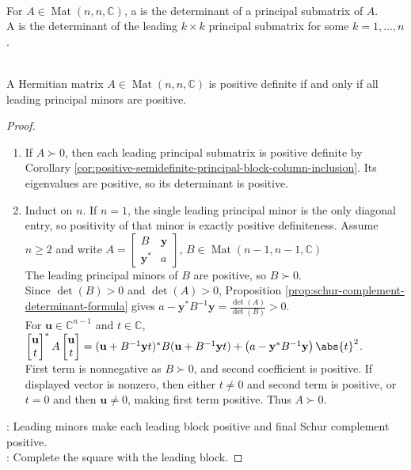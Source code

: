 \begin{definition} \label{def:principal-and-leading-principal-minors} \\
For $A\in\operatorname{Mat}(n,n,\mathbb{C})$, a  is the determinant of a principal submatrix of $A$.\\
A  is the determinant of the leading $k\times k$ principal submatrix for some $k=1,\ldots,n$.
\end{definition}

\begin{theorem} \label{thm:sylvester-positive-definite-criterion-leading-minors} \\
A Hermitian matrix $A\in\operatorname{Mat}(n,n,\mathbb{C})$ is positive definite if and only if all leading principal minors are positive.
\begin{proof}
\begin{enumerate}[label=\roman*.]
\setlength{\itemsep}{0pt}
\item[$(\Rightarrow)$] If $A\succ0$, then each leading principal submatrix is positive definite by Corollary \ref{cor:positive-semidefinite-principal-block-column-inclusion}. Its eigenvalues are positive, so its determinant is positive.
\item[$(\Leftarrow)$] Induct on $n$. If $n=1$, the single leading principal minor is the only diagonal entry, so positivity of that minor is exactly positive definiteness. Assume $n\geq2$ and write $A=
\begin{bmatrix}
B & \mathbf{y}\\
\mathbf{y}^* & a
\end{bmatrix}$, $B\in\operatorname{Mat}(n-1,n-1,\mathbb{C})$\\
The leading principal minors of $B$ are positive, so $B\succ0$.\\
Since $\det(B)>0$ and $\det(A)>0$, Proposition \ref{prop:schur-complement-determinant-formula} gives $a-\mathbf{y}^*B^{-1}\mathbf{y}=\frac{\det(A)}{\det(B)}>0$.\\
For $\mathbf{u}\in\mathbb{C}^{n-1}$ and $t\in\mathbb{C}$, $\begin{bmatrix}\mathbf{u}\\ t\end{bmatrix}^*
A
\begin{bmatrix}\mathbf{u}\\ t\end{bmatrix} =(\mathbf{u}+B^{-1}\mathbf{y}t)^*B(\mathbf{u}+B^{-1}\mathbf{y}t) +\left(a-\mathbf{y}^*B^{-1}\mathbf{y}\right)\abs{t}^2$.\\
First term is nonnegative as $B\succ0$, and second coefficient is positive. If displayed vector is nonzero, then either $t\neq0$ and second term is positive, or $t=0$ and then $\mathbf{u}\neq0$, making first term positive. Thus $A\succ0$.
\end{enumerate}
: Leading minors make each leading block positive and final Schur complement positive.\\
: Complete the square with the leading block.
\end{proof}
\end{theorem}

